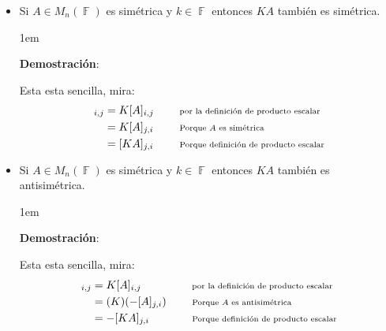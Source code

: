 \documentclass[12pt, fleqn]{report}                             %
\newenvironment{SmallIndentation}[1][0.75em]                    %
        {\begin{adjustwidth}{#1}{}\begin{footnotesize}}             %
        {\end{footnotesize}\end{adjustwidth}}                       %
\DeclareMathOperator \Space     {\quad}                         %
\newcommand \Remember[1]    {\Space\text{\scriptsize{#1}}}      %
\theoremstyle{break}                                            %
\DeclareMathOperator \GenericField {\mathbb{F}}                 %
\begin{document}
\begin{itemize}
\begin{SmallIndentation}[1em]
                            \end{SmallIndentation}

                        \item Si $A \in M_{n}(\GenericField)$ es simétrica y $k \in \GenericField$ entonces 
                            $KA$ también es simétrica.

                            \begin{SmallIndentation}[1em]
                                \textbf{Demostración}:

                                Esta esta sencilla, mira:
                                \begin{align*}
                                    [KA]_{i, j}
                                        &= K [A]_{i, j}     
                                            && \Remember{por la definición de producto escalar} \\
                                        &= K [A]_{j, i}
                                            && \Remember{Porque $A$ es simétrica}               \\
                                        &= [KA]_{j, i}
                                            && \Remember{Porque definición de producto escalar}
                                \end{align*}

                            \end{SmallIndentation}

                        \item Si $A \in M_{n}(\GenericField)$ es simétrica y $k \in \GenericField$ entonces 
                            $KA$ también es antisimétrica.

                            \begin{SmallIndentation}[1em]
                                \textbf{Demostración}:

                                Esta esta sencilla, mira:
                                \begin{align*}
                                    [KA]_{i, j}
                                        &= K [A]_{i, j}     
                                            && \Remember{por la definición de producto escalar} \\
                                        &= (K)(-[A]_{j, i})
                                            && \Remember{Porque $A$ es antisimétrica}           \\
                                        &= -[KA]_{j, i}
                                            && \Remember{Porque definición de producto escalar}
                                \end{align*}


\end{SmallIndentation}
\end{itemize}
\end{document}
